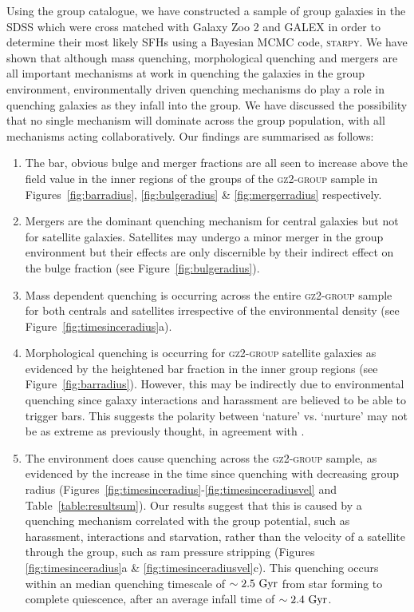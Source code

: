 \documentclass[useAMS,usenatbib]{mn2e}
\begin{document}
Using the \citet{berlind06} group catalogue, we have constructed a sample of group galaxies in the SDSS which were cross matched with Galaxy Zoo 2 and GALEX in order to determine their most likely SFHs using a Bayesian MCMC code, \textsc{starpy}. We have shown that although mass quenching, morphological quenching and mergers are all important mechanisms at work in quenching the galaxies in the group environment, environmentally driven quenching mechanisms do play a role in quenching galaxies as they infall into the group. We have discussed the possibility that no single mechanism will dominate across the group population, with all mechanisms acting collaboratively. Our findings are summarised as follows:
\begin{enumerate}
\item The bar, obvious bulge and merger fractions are all seen to increase above the field value in the inner regions of the groups of the \textsc{gz2-group} sample in Figures~\ref{fig:barradius}, \ref{fig:bulgeradius} \& \ref{fig:mergerradius} respectively.  
 
\item Mergers are the dominant quenching mechanism for central galaxies but not for satellite galaxies. Satellites may undergo a minor merger in the group environment but their effects are only discernible by their indirect effect on the bulge fraction (see Figure~\ref{fig:bulgeradius}).
 
\item Mass dependent quenching is occurring across the entire \textsc{gz2-group} sample for both centrals and satellites irrespective of the environmental density (see Figure~\ref{fig:timesinceradius}a).
 
\item Morphological quenching is occurring for \textsc{gz2-group} satellite galaxies as evidenced by the heightened bar fraction in the inner group regions (see Figure~\ref{fig:barradius}). However, this may be indirectly due to environmental quenching since galaxy interactions and harassment are believed to be able to trigger bars. This suggests the polarity between `nature' vs. `nurture' may not be as extreme as previously thought, in agreement with \cite{skibba12}. 

\item The environment does cause quenching across the \textsc{gz2-group} sample, as evidenced by the increase in the time since quenching with decreasing group radius (Figures~\ref{fig:timesinceradius}-\ref{fig:timesinceradiusvel} and Table~\ref{table:resultsum}). Our results suggest that this is caused by a quenching mechanism correlated with the group potential, such as harassment, interactions and starvation, rather than the velocity of a satellite through the group, such as ram pressure stripping (Figures \ref{fig:timesinceradius}a \&  \ref{fig:timesinceradiusvel}c). This quenching occurs within an median quenching timescale of $\sim2.5~\rm{Gyr}$ from star forming to complete quiescence, after an average infall time of $\sim 2.4 ~\rm{Gyr}$. 
  
\end{enumerate}
\end{document}
